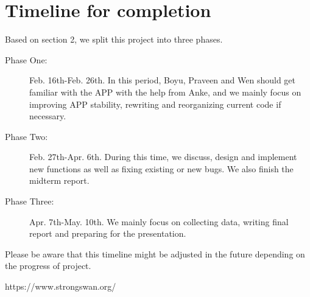 \documentclass[letterpaper]{sig-alternate-10pt}
\begin{document}
\section{Timeline for completion}
Based on section 2, we split this project into three phases.
\begin{description}
  \item[Phase One:] Feb. 16th-Feb. 26th. In this period, Boyu, Praveen and Wen should get familiar with the APP with the help from Anke, and we mainly focus on improving APP stability, rewriting and reorganizing current code if necessary.
  \item[Phase Two:] Feb. 27th-Apr. 6th. During this time, we discuss, design and implement new functions as well as fixing existing or new bugs. We also finish the midterm report.
  \item[Phase Three:] Apr. 7th-May. 10th. We mainly focus on collecting data, writing final report and preparing for the presentation.
\end{description}

Please be aware that this timeline might be adjusted in the future depending on the progress of project.

\begin{small}
	
\end{small}

\begin{thebibliography}{9}

  https://www.strongswan.org/

\iffalse
\bibitem{lamport94}
  Leslie Lamport,
  \emph{\LaTeX: a document preparation system}.
  Addison Wesley, Massachusetts,
  2nd edition,
  1994.
\fi

\end{thebibliography}
\end{document}
